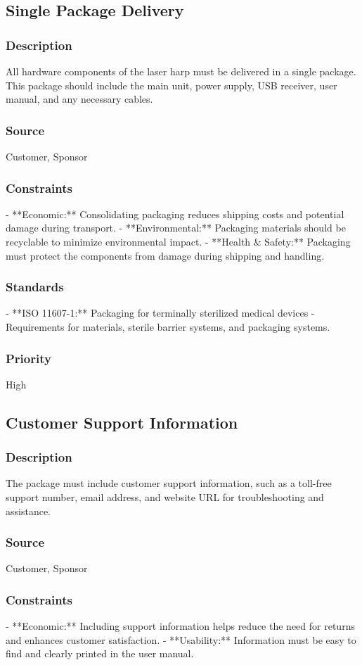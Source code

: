 \subsection{Single Package Delivery}
\subsubsection{Description}
All hardware components of the laser harp must be delivered in a single package. This package should include the main unit, power supply, USB receiver, user manual, and any necessary cables.
\subsubsection{Source}
Customer, Sponsor
\subsubsection{Constraints}
- **Economic:** Consolidating packaging reduces shipping costs and potential damage during transport.
- **Environmental:** Packaging materials should be recyclable to minimize environmental impact.
- **Health & Safety:** Packaging must protect the components from damage during shipping and handling.
\subsubsection{Standards}
- **ISO 11607-1:** Packaging for terminally sterilized medical devices - Requirements for materials, sterile barrier systems, and packaging systems.
\subsubsection{Priority}
High

\subsection{Customer Support Information}
\subsubsection{Description}
The package must include customer support information, such as a toll-free support number, email address, and website URL for troubleshooting and assistance.
\subsubsection{Source}
Customer, Sponsor
\subsubsection{Constraints}
- **Economic:** Including support information helps reduce the need for returns and enhances customer satisfaction.
- **Usability:** Information must be easy to find and clearly printed in the user manual.
